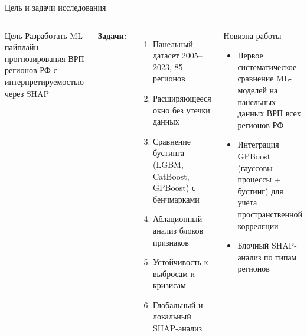 \documentclass[aspectratio=169,10pt]{beamer}
\begin{document}
\begin{frame}{Цель и задачи исследования}
\begin{columns}[T]
\begin{alertblock}{Цель}
\small Разработать ML-пайплайн прогнозирования ВРП регионов РФ с интерпретируемостью через SHAP
\end{alertblock}
\medskip
\textbf{Задачи:}
\begin{enumerate}\setlength\itemsep{3pt}\small
  \item Панельный датасет 2005–2023, 85 регионов
  \item Расширяющееся окно без утечки данных
  \item Сравнение бустинга (LGBM, CatBoost, GPBoost) с бенчмарками
  \item Аблационный анализ блоков признаков
  \item Устойчивость к выбросам и кризисам
  \item Глобальный и локальный SHAP-анализ
\end{enumerate}
\begin{block}{Новизна работы}
\begin{itemize}\setlength\itemsep{4pt}
  \item Первое систематическое сравнение ML-моделей на панельных данных ВРП всех регионов РФ
  \item Интеграция GPBoost (гауссовы процессы + бустинг) для учёта пространственной корреляции
  \item Блочный SHAP-анализ по типам регионов
\end{itemize}
\end{block}
\end{columns}
\end{frame}
\end{document}
